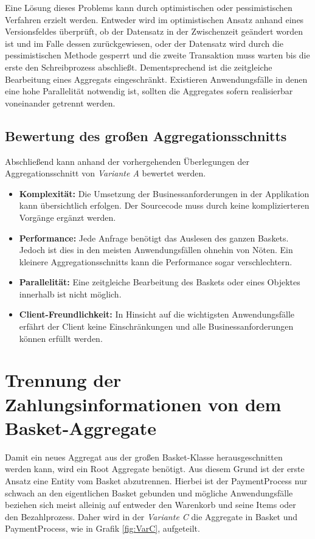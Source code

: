 Eine Lösung dieses Problems kann durch optimistischen oder pessimistischen Verfahren erzielt werden. Entweder wird im optimistischen Ansatz anhand eines Versionsfeldes überprüft, ob der Datensatz in der Zwischenzeit geändert worden ist und im Falle dessen zurückgewiesen, oder der Datensatz wird durch die pessimistischen Methode gesperrt und die zweite Transaktion muss warten bis die erste den Schreibprozess abschließt. Dementsprechend ist die zeitgleiche Bearbeitung eines Aggregats eingeschränkt. Existieren Anwendungsfälle in denen eine hohe Parallelität notwendig ist, sollten die Aggregates sofern realisierbar voneinander getrennt werden. 

\subsection{Bewertung des großen Aggregationsschnitts}

Abschließend kann anhand der vorhergehenden Überlegungen der Aggregationsschnitt von \emph{Variante A} bewertet werden.


\begin{itemize}[noitemsep,nolistsep,topsep=-2pt]
	\item \textbf{Komplexität: } {Die Umsetzung der Businessanforderungen in der Applikation kann übersichtlich erfolgen. Der Sourcecode muss durch keine komplizierteren Vorgänge ergänzt werden. }
	\item \textbf{Performance: } {Jede Anfrage benötigt das Auslesen des ganzen Baskets. Jedoch ist dies in den meisten Anwendungsfällen ohnehin von Nöten. Ein kleinere Aggregationsschnitts kann die Performance sogar verschlechtern. }
	\item \textbf{Parallelität: } {Eine zeitgleiche Bearbeitung des Baskets oder eines Objektes innerhalb ist nicht möglich.}
	\item \textbf{Client-Freundlichkeit: } {In Hinsicht auf die wichtigsten Anwendungsfälle erfährt der Client keine Einschränkungen und alle Businessanforderungen können erfüllt werden.}
\end{itemize}

\section{Trennung der Zahlungsinformationen von dem Basket-Aggregate}

Damit ein neues Aggregat aus der großen Basket-Klasse herausgeschnitten werden kann, wird ein Root Aggregate benötigt. Aus diesem Grund ist der erste Ansatz eine Entity vom Basket abzutrennen. Hierbei ist der PaymentProcess nur schwach an den eigentlichen Basket gebunden und mögliche Anwendungsfälle beziehen sich meist alleinig auf entweder den Warenkorb und seine Items oder den Bezahlprozess. Daher wird in der \emph{Variante C} die Aggregate in Basket und PaymentProcess, wie in Grafik \ref{fig:VarC}, aufgeteilt. 

